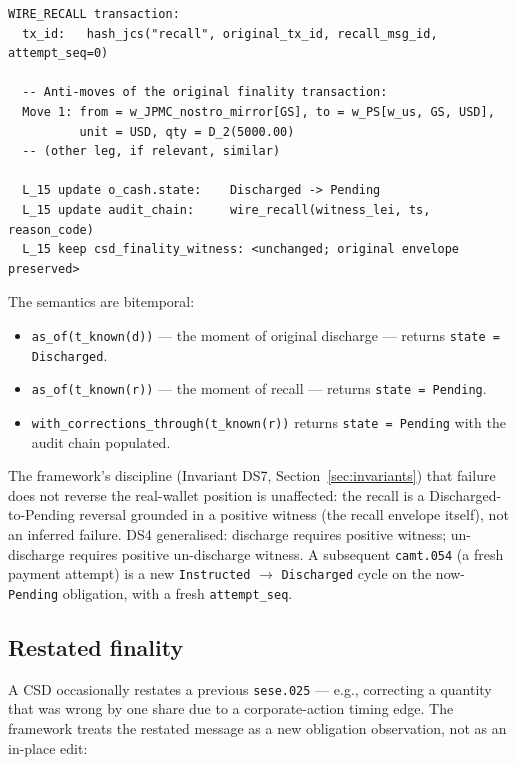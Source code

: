 \documentclass[11pt,a4paper]{article}
\begin{document}
\begin{lstlisting}
WIRE_RECALL transaction:
  tx_id:   hash_jcs("recall", original_tx_id, recall_msg_id, attempt_seq=0)

  -- Anti-moves of the original finality transaction:
  Move 1: from = w_JPMC_nostro_mirror[GS], to = w_PS[w_us, GS, USD],
          unit = USD, qty = D_2(5000.00)
  -- (other leg, if relevant, similar)

  L_15 update o_cash.state:    Discharged -> Pending
  L_15 update audit_chain:     wire_recall(witness_lei, ts, reason_code)
  L_15 keep csd_finality_witness: <unchanged; original envelope preserved>
\end{lstlisting}

The semantics are bitemporal:
\begin{itemize}[nosep]
\item \texttt{as\_of(t\_known(d))} --- the moment of original discharge --- returns \texttt{state = Discharged}.
\item \texttt{as\_of(t\_known(r))} --- the moment of recall --- returns \texttt{state = Pending}.
\item \texttt{with\_corrections\_through(t\_known(r))} returns \texttt{state = Pending} with the audit chain populated.
\end{itemize}

The framework's discipline (Invariant DS7, Section~\ref{sec:invariants}) that failure does not reverse the real-wallet position is unaffected: the recall is a Discharged-to-Pending reversal grounded in a positive witness (the recall envelope itself), not an inferred failure. DS4 generalised: discharge requires positive witness; un-discharge requires positive un-discharge witness. A subsequent \texttt{camt.054} (a fresh payment attempt) is a new \texttt{Instructed} $\to$ \texttt{Discharged} cycle on the now-\texttt{Pending} obligation, with a fresh \texttt{attempt\_seq}.

\subsection{Restated finality}
\label{sec:variant-restated-finality}

A CSD occasionally restates a previous \texttt{sese.025} --- e.g., correcting a quantity that was wrong by one share due to a corporate-action timing edge. The framework treats the restated message as a new obligation observation, not as an in-place edit:
\end{document}
